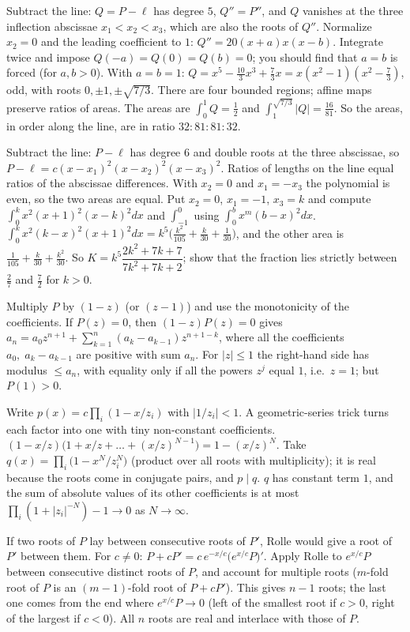 \documentclass[11pt,a4paper]{article}
\begin{document}
 Subtract the line: $Q=P-\ell$ has degree $5$, $Q''=P''$, and $Q$ vanishes at the three inflection abscissae $x_1<x_2<x_3$, which are also the roots of $Q''$.
 Normalize $x_2=0$ and the leading coefficient to $1$: $Q''=20(x+a)x(x-b)$. Integrate twice and impose $Q(-a)=Q(0)=Q(b)=0$; you should find that $a=b$ is forced (for $a,b>0$).
 With $a=b=1$: $Q=x^5-\frac{10}3x^3+\frac73x=x(x^2-1)(x^2-\frac73)$, odd, with roots $0,\pm1,\pm\sqrt{7/3}$. There are four bounded regions; affine maps preserve ratios of areas.
 The areas are $\int_0^1Q=\frac12$ and $\int_1^{\sqrt{7/3}}|Q|=\frac{16}{81}$. So the areas, in order along the line, are in ratio $32:81:81:32$.

 Subtract the line: $P-\ell$ has degree $6$ and double roots at the three abscissae, so $P-\ell=c(x-x_1)^2(x-x_2)^2(x-x_3)^2$.
 Ratios of lengths on the line equal ratios of the abscissae differences. With $x_2=0$ and $x_1=-x_3$ the polynomial is even, so the two areas are equal.
 Put $x_2=0$, $x_1=-1$, $x_3=k$ and compute $\int_0^kx^2(x+1)^2(x-k)^2dx$ and $\int_{-1}^0$ using $\int_0^bx^m(b-x)^2dx$.
 $\int_0^kx^2(k-x)^2(x+1)^2dx=k^5\bigl(\frac{k^2}{105}+\frac k{30}+\frac1{30}\bigr)$, and the other area is $\frac1{105}+\frac k{30}+\frac{k^2}{30}$.
 So $K=k^5\dfrac{2k^2+7k+7}{7k^2+7k+2}$; show that the fraction lies strictly between $\frac27$ and $\frac72$ for $k>0$.

 Multiply $P$ by $(1-z)$ (or $(z-1)$) and use the monotonicity of the coefficients.
 If $P(z)=0$, then $(1-z)P(z)=0$ gives $a_n=a_0z^{n+1}+\sum_{k=1}^n(a_k-a_{k-1})z^{n+1-k}$, where all the coefficients $a_0,\;a_k-a_{k-1}$ are positive with sum $a_n$.
 For $|z|\le1$ the right-hand side has modulus $\le a_n$, with equality only if all the powers $z^{j}$ equal $1$, i.e.\ $z=1$; but $P(1)>0$.

 Write $p(x)=c\prod_i(1-x/z_i)$ with $|1/z_i|<1$. A geometric-series trick turns each factor into one with tiny non-constant coefficients.
 $(1-x/z)\bigl(1+x/z+\dots+(x/z)^{N-1}\bigr)=1-(x/z)^N$. Take $q(x)=\prod_i\bigl(1-x^N/z_i^N\bigr)$ (product over all roots with multiplicity); it is real because the roots come in conjugate pairs, and $p\mid q$.
 $q$ has constant term $1$, and the sum of absolute values of its other coefficients is at most $\prod_i(1+|z_i|^{-N})-1\to0$ as $N\to\infty$.

 If two roots of $P$ lay between consecutive roots of $P'$, Rolle would give a root of $P'$ between them.
 For $c\ne0$: $P+cP'=c\,e^{-x/c}\bigl(e^{x/c}P\bigr)'$. Apply Rolle to $e^{x/c}P$ between consecutive distinct roots of $P$, and account for multiple roots ($m$-fold root of $P$ is an $(m-1)$-fold root of $P+cP'$).
 This gives $n-1$ roots; the last one comes from the end where $e^{x/c}P\to0$ (left of the smallest root if $c>0$, right of the largest if $c<0$). All $n$ roots are real and interlace with those of $P$.
\end{document}
